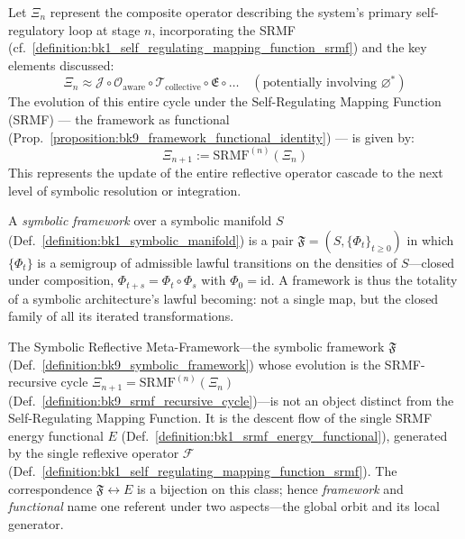 \begin{definition}
\label{definition:bk9_srmf_recursive_cycle}
Let $\Xi_n$ represent the composite operator describing the system's primary self-regulatory loop at stage $n$, incorporating the SRMF (cf.~\ref{definition:bk1_self_regulating_mapping_function_srmf}) and the key elements discussed:
\[
\Xi_n \approx \mathcal{J} \circ \mathcal{O}_{\text{aware}} \circ \mathcal{T}_{\text{collective}} \circ \mathfrak{E} \circ \dots \quad (\text{potentially involving } \varnothing^*)
\]
The evolution of this entire cycle under the Self-Regulating Mapping Function (SRMF) --- the framework as functional (Prop.~\ref{proposition:bk9_framework_functional_identity}) --- is given by:
\[
\Xi_{n+1} := \mathrm{SRMF}^{(n)}(\Xi_n)
\]
This represents the update of the entire reflective operator cascade to the next level of symbolic resolution or integration.
\end{definition}
\begin{definition}
\label{definition:bk9_symbolic_framework}
A \emph{symbolic framework} over a symbolic manifold $S$ (Def.~\ref{definition:bk1_symbolic_manifold}) is a pair $\mathfrak{F} = (S, \{\Phi_t\}_{t\ge 0})$ in which $\{\Phi_t\}$ is a semigroup of admissible lawful transitions on the densities of $S$---closed under composition, $\Phi_{t+s} = \Phi_t \circ \Phi_s$ with $\Phi_0 = \mathrm{id}$. A framework is thus the totality of a symbolic architecture's lawful becoming: not a single map, but the closed family of all its iterated transformations.
\end{definition}
\begin{proposition}
\label{proposition:bk9_framework_functional_identity}
The Symbolic Reflective Meta-Framework---the symbolic framework $\mathfrak{F}$ (Def.~\ref{definition:bk9_symbolic_framework}) whose evolution is the SRMF-recursive cycle $\Xi_{n+1} = \mathrm{SRMF}^{(n)}(\Xi_n)$ (Def.~\ref{definition:bk9_srmf_recursive_cycle})---is not an object distinct from the Self-Regulating Mapping Function. It is the descent flow of the single SRMF energy functional $E$ (Def.~\ref{definition:bk1_srmf_energy_functional}), generated by the single reflexive operator $\mathcal{F}$ (Def.~\ref{definition:bk1_self_regulating_mapping_function_srmf}). The correspondence $\mathfrak{F} \leftrightarrow E$ is a bijection on this class; hence \emph{framework} and \emph{functional} name one referent under two aspects---the global orbit and its local generator.
\end{proposition}
